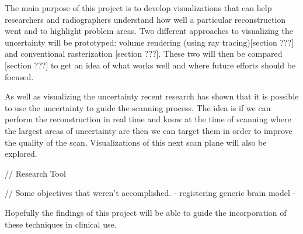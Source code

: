 The main purpose of this project is to develop visualizations that can help researchers and radiographers understand how well a particular reconstruction went and to highlight problem areas. Two different approaches to visualizing the uncertainty will be prototyped: volume rendering (using ray tracing)[section ???] and conventional rasterization [section ???]. These two will then be compared [section ???] to get an idea of what works well and where future efforts should be focused.

As well as visualizing the uncertainty recent research\cite{uncertaintysvd} has shown that it is possible to use the uncertainty to guide the scanning process. The idea is if we can perform the reconstruction in real time and know at the time of scanning where the largest areas of uncertainty are then we can target them in order to improve the quality of the scan. Visualizations of this next scan plane will also be explored.

// Research Tool

// Some objectives that weren't accomplished.
	- registering generic brain model
	- 

Hopefully the findings of this project will be able to guide the incorporation of these techniques in clinical use.